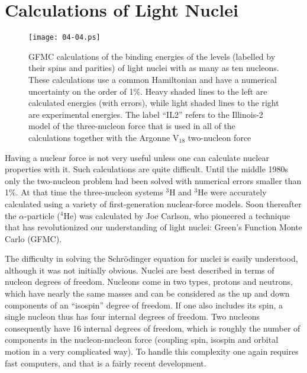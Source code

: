 \documentclass{svmult}
\begin{document}
\section{Calculations of Light Nuclei}

\begin{figure}[p]
  \texttt{[image: 04-04.ps]}
  \caption{GFMC calculations of the binding energies of the levels (labelled by 
   their spins and parities) of light nuclei with as many as ten nucleons. These
   calculations use a common Hamiltonian and have a numerical uncertainty on
   the order of 1\%. Heavy shaded lines to the left are calculated energies 
   (with errors), while light shaded lines to the right are experimental 
   energies. The label ``IL2'' refers to the Illinois-2 model of the 
   three-nucleon force that is used in all of the calculations together with 
   the Argonne V$_{18}$ two-nucleon force}
\end{figure}

Having a nuclear force is not very useful unless one can calculate nuclear
properties with it.  Such calculations are quite difficult. Until the middle
1980s only the two-nucleon problem had been solved with numerical errors smaller
than 1\%.  At that time the three-nucleon systems $^3$H and $^3$He were
accurately
calculated
using a variety of first-generation nuclear-force models\cite{3N}.  Soon
thereafter the
$\alpha$-particle ($^4$He) was
calculated by Joe Carlson, who pioneered a technique that has revolutionized our
understanding of light nuclei: Green's Function Monte Carlo
(GFMC)\cite{GFMC}.

The difficulty in solving the Schr\"odinger equation for nuclei is easily
understood, although it was not initially obvious. Nuclei are best described in
terms of nucleon degrees of freedom. Nucleons come in two types, protons and
neutrons, which have nearly the same masses and can be considered as the up and
down components of an ``isospin'' degree of freedom. If one also includes its
spin, a single nucleon thus has four internal degrees of freedom. Two nucleons
consequently have 16 internal degrees of freedom, which is roughly the number of
components in the nucleon-nucleon force (coupling spin, isospin and orbital
motion in a very complicated way).  To handle this complexity one again requires
fast computers, and that is a fairly recent development.
\end{document}
